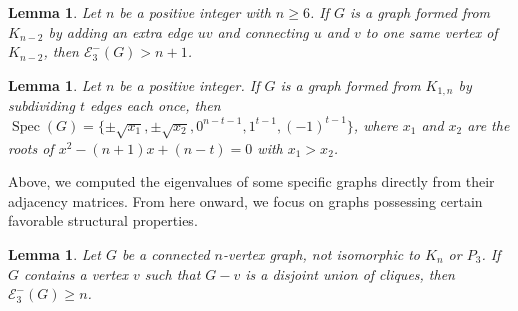 \documentclass[a4paper,12pt]{article}
\theoremstyle{plain}
\newtheorem{lemma}[thm]{Lemma}
\begin{document}
\begin{lemma}\label{lem:K_(n-2)+K_2}
Let $n$ be a positive integer with $n\geq 6$. If $G$ is a graph formed from $K_{n-2}$ by adding an extra edge $uv$ and connecting $u$ and $v$ to one same vertex of $K_{n-2}$, then $\mathcal{E}_3^{-}(G)>n+1$. 
\end{lemma}

\begin{lemma}\label{lem:star-plus}
Let $n$ be a positive integer. If $G$ is a graph formed from $K_{1,n}$ by subdividing $t$ edges each once, then  $\operatorname{Spec}(G)=\{\pm\sqrt{x_1},\pm\sqrt{x_2},0^{n-t-1},1^{t-1},(-1)^{t-1}\}$, where $x_1$ and $x_2$ are the roots of $x^2-(n+1)x+(n-t)=0$ with $x_1>x_2$. 
\end{lemma}



Above, we computed the eigenvalues of some specific graphs directly from their adjacency matrices. From here onward, we focus on graphs possessing certain favorable structural properties.


\begin{lemma}\label{lem:UnionOfCliques}
Let $G$ be a connected $n$-vertex graph, not isomorphic to $K_n$ or $P_3$. If $G$ contains a vertex $v$ such that $G-v$ is a disjoint union of cliques, then $\mathcal{E}_3^{-}(G) \geq n$.
\end{lemma}
\end{document}
